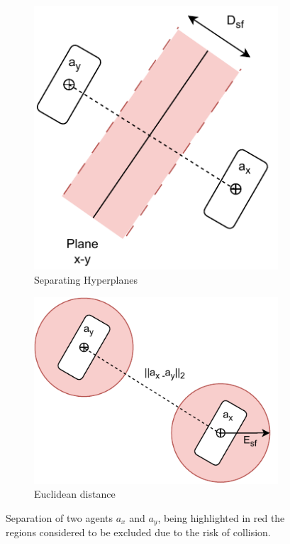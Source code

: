 \documentclass[a4paper,fleqn]{cas-sc}
\begin{document}
\begin{figure}
    \centering
        \begin{subfigure}{0.5\textwidth}
          \centering
          \includegraphics[width=.7\textwidth]{figs/Planes.drawio.pdf}
          \caption{Separating Hyperplanes}
          \label{fig:figPlane}
        \end{subfigure}%
        \begin{subfigure}{.5\textwidth}
          \centering
          \includegraphics[width=.7\textwidth]{figs/Euclidean.drawio.pdf}
          \caption{Euclidean distance}
          \label{fig:figEuclidean}
        \end{subfigure}
    \caption{Separation of two agents $a_x$ and $a_y$, being highlighted in red the regions considered to be excluded due to the risk of collision.}
    \label{fig:DistanceMetrics}
\end{figure}
    
\end{document}
